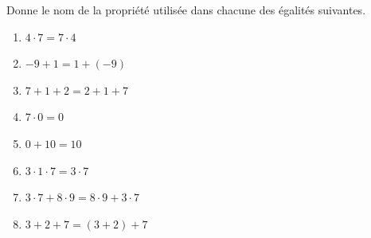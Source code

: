 %
%
	Donne le nom de la propriété utilisée dans chacune des égalités suivantes.
	\begin{enumerate}[cols=2]
		\item \(4 \cdot 7 = 7 \cdot 4 \)
		\item \(-9 + 1 = 1 + (-9)\)
		\item \(7 + 1 + 2 = 2 + 1 + 7 \)
		\item \(7 \cdot 0 = 0 \)
		\item \(0 + 10 = 10 \)
		\item \(3 \cdot 1 \cdot 7 = 3 \cdot 7\)
		\item \(3 \cdot 7 + 8 \cdot 9 = 8 \cdot 9 + 3 \cdot 7\)
		\item \(3 + 2 + 7 = (3 + 2) + 7\)
	\end{enumerate}
